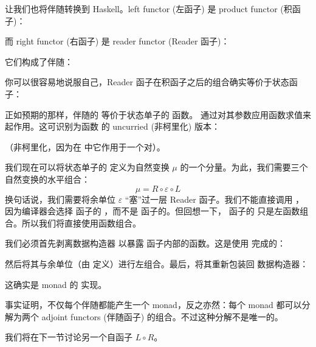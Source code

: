 让我们也将伴随转换到 Haskell。left functor (左函子) 是 product functor (积函子)：

而 right functor (右函子) 是 reader functor (Reader 函子)：

它们构成了伴随：

你可以很容易地说服自己，Reader 函子在积函子之后的组合确实等价于状态函子：

正如预期的那样，伴随的  等价于状态单子的  函数。  通过对其参数应用函数求值来起作用。这可识别为函数  的 uncurried (非柯里化) 版本：

（非柯里化，因为在  中它作用于一个对）。

我们现在可以将状态单子的  定义为自然变换 $\mu$ 的一个分量。为此，我们需要三个自然变换的水平组合：
\[\mu = R \circ \varepsilon \circ L\]
换句话说，我们需要将余单位 $\varepsilon$ “塞”过一层 Reader 函子。我们不能直接调用 ，因为编译器会选择  函子的 ，而不是  函子的。但回想一下， 函子的  只是左函数组合。所以我们将直接使用函数组合。

我们必须首先剥离数据构造器  以暴露  函子内部的函数。这是使用  完成的：

然后将其与余单位（由  定义）进行左组合。最后，将其重新包装回  数据构造器：

这确实是  monad 的  实现。

事实证明，不仅每个伴随都能产生一个 monad，反之亦然：每个 monad 都可以分解为两个 adjoint functors (伴随函子) 的组合。不过这种分解不是唯一的。

我们将在下一节讨论另一个自函子 $L \circ R$。